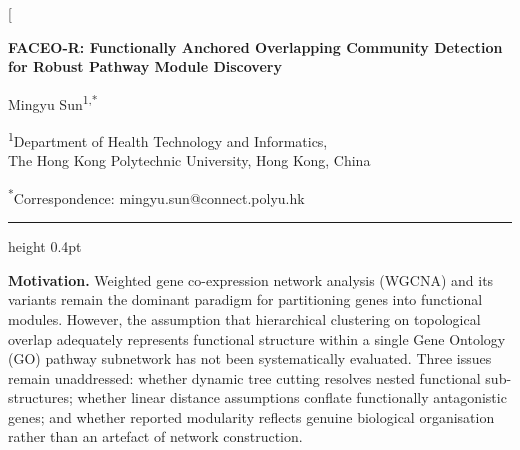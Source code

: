 \documentclass[twocolumn,10pt,a4paper]{article}
\begin{document}
\twocolumn[{
\begin{center}
{\LARGE\bfseries FACEO-R: Functionally Anchored Overlapping Community Detection for
Robust Pathway Module Discovery\par}
\vspace{0.85em}
{\large Mingyu Sun\textsuperscript{1,*}\par}
\vspace{0.30em}
{\small\textsuperscript{1}Department of Health Technology and Informatics,\\
The Hong Kong Polytechnic University, Hong Kong, China\par}
{\small \textsuperscript{*}Correspondence: mingyu.sun@connect.polyu.hk\par}
\end{center}
\vspace{0.35em}
\hrule height 0.4pt
\vspace{0.60em}
\begin{minipage}{0.955\textwidth}
\footnotesize
\setlength{\parindent}{0pt}
\setlength{\parskip}{4pt}
\noindent\textbf{Motivation.} Weighted gene co-expression network analysis (WGCNA) and its
variants remain the dominant paradigm for partitioning genes into functional modules.
However, the assumption that hierarchical clustering on topological overlap adequately
represents functional structure within a single Gene Ontology (GO) pathway subnetwork has
not been systematically evaluated. Three issues remain unaddressed: whether dynamic tree
cutting resolves nested functional sub-structures; whether linear distance assumptions
conflate functionally antagonistic genes; and whether reported modularity reflects genuine
biological organisation rather than an artefact of network construction.


\end{minipage}}
\end{document}

